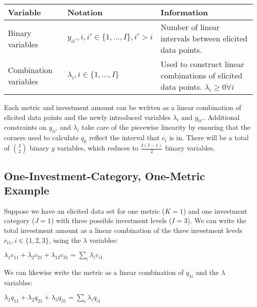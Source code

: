 \documentclass[letterpaper,10pt,english]{sphinxmanual}
\begin{document}
\begin{savenotes}\sphinxattablestart
\centering
{}
\sphinxthecaptionisattop
{}\label{\detokenize{optimizers:table-10}}\label{\detokenize{optimizers:tbl-milpvar}}
\sphinxaftertopcaption
\begin{tabulary}{\linewidth}[t]{|T|T|T|}
\hline
\sphinxstyletheadfamily 
Variable
&\sphinxstyletheadfamily 
Notation
&\sphinxstyletheadfamily 
Information
\\
\hline
Binary variables
&
\(y_{ii'}, i, i' \in \{1, ..., I\}, i' > i\)
&
Number of linear intervals between elicited data points.
\\
\hline
Combination variables
&
\(\lambda_{i}, i \in \{1, ..., I\}\)
&
Used to construct linear combinations of elicited data points. \(\lambda_{i} \geq 0 \forall i\)
\\
\hline
\end{tabulary}
\par
\sphinxattableend\end{savenotes}

Each metric and investment amount can be written as a linear combination of elicited data points and the newly introduced variables \(\lambda_{i}\) and \(y_{ii'}\). Additional constraints on \(y_{ii'}\) and \(\lambda_{i}\) take care of the piecewise linearity by ensuring that the corners used to calculate \(q_k\) reflect the interval that \(c_i\) is in. There will be a total of \(\binom{I}{2}\) binary \(y\) variables, which reduces to \(\frac{I(I-1)}{2}\) binary variables.


\subsection{One-Investment-Category, One-Metric Example}
\label{\detokenize{optimizers:one-investment-category-one-metric-example}}
Suppose we have an elicited data set for one metric (\(K = 1\)) and one investment category (\(J = 1\)) with three possible investment levels (\(I = 3\)). We can write the total investment amount as a linear combination of the three investment levels \(c_{i1}, i \in \{1, 2, 3\}\), using the \(\lambda\) variables:

\(\lambda_{1}c_{11} + \lambda_{2}c_{21} + \lambda_{13}c_{31} = \sum_{i} \lambda_{i}c_{i1}\)

We can likewise write the metric as a linear combination of \(q_{1i}\) and the \(\lambda\) variables:

\(\lambda_{1}q_{11} + \lambda_{2}q_{21} + \lambda_{3}q_{31} = \sum_{i} \lambda_{i}q_{i1}\)
\end{document}
